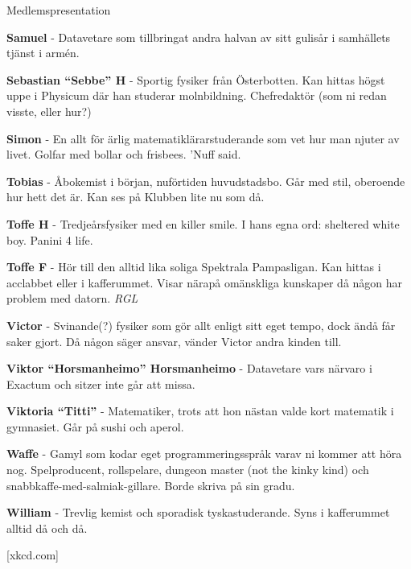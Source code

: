 \documentclass{spektraklet}
\begin{document}
\begin{artikel}{Medlemspresentation}{}
\begin{twocolumns}
\textbf{Samuel} - Datavetare som tillbringat andra halvan av sitt gulisår i samhällets tjänst i armén. %

\textbf{Sebastian ``Sebbe'' H} - Sportig fysiker från Österbotten. Kan hittas högst uppe i Physicum där han studerar molnbildning. Chefredaktör (som ni redan visste, eller hur?)

\textbf{Simon} - En allt för ärlig matematiklärarstuderande som vet hur man njuter av livet. Golfar med bollar och frisbees. ’Nuff said.

\textbf{Tobias} - Åbokemist i början, nuförtiden huvudstadsbo. Går med stil, oberoende hur hett det är. Kan ses på Klubben lite nu som då. %

\textbf{Toffe H} - Tredjeårsfysiker med en killer smile. I hans egna ord: sheltered white boy. Panini 4 life.

\textbf{Toffe F} - Hör till den alltid lika soliga Spektrala Pampasligan. Kan hittas i acclabbet eller i kafferummet. Visar närapå omänskliga kunskaper då någon har problem med datorn. \emph{RGL}

\textbf{Victor} - Svinande(?) fysiker som gör allt enligt sitt eget tempo, dock ändå får saker gjort. Då någon säger ansvar, vänder Victor andra kinden till.

\textbf{Viktor ``Horsmanheimo'' Horsmanheimo} - Datavetare vars närvaro i Exactum och sitzer inte går att missa.

\textbf{Viktoria ``Titti''} - Matematiker, trots att hon nästan valde kort matematik i gymnasiet. Går på sushi och aperol.

\textbf{Waffe} - Gamyl som kodar eget programmeringsspråk varav ni kommer att höra nog. Spelproducent, rollspelare, dungeon master (not the kinky kind) och snabbkaffe-med-salmiak-gillare. Borde skriva på sin gradu.

\textbf{William} - Trevlig kemist och sporadisk tyskastuderande. Syns i kafferummet alltid då och då.

\end{twocolumns}

[xkcd.com]
\end{artikel}
\end{document}
